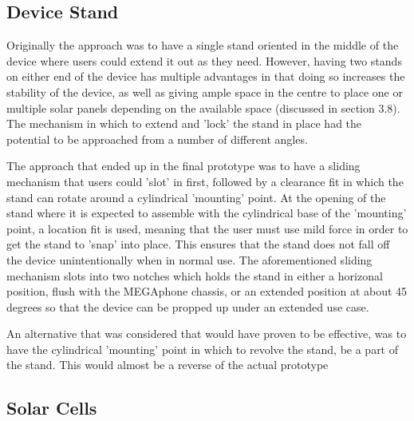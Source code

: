 \subsection{Device Stand}

Originally the approach was to have a single stand oriented in the middle of the device where users could extend it out as they need.
However, having two stands on either end of the device has multiple advantages in that doing so increases the stability of the device, as well as giving ample space in the centre to place one or multiple solar panels depending on the available space (discussed in section 3.8).
The mechanism in which to extend and 'lock' the stand in place had the potential to be approached from a number of different angles.

The approach that ended up in the final prototype was to have a sliding mechanism that users could 'slot' in first, followed by a clearance fit in which the stand can rotate around a cylindrical 'mounting' point.  %
At the opening of the stand where it is expected to assemble with the cylindrical base of the 'mounting' point, a location fit is used, meaning that the user must use mild force in order to get the stand to 'snap' into place.
This ensures that the stand does not fall off the device unintentionally when in normal use.
The aforementioned sliding mechanism slots into two notches which holds the stand in either a horizonal position, flush with the MEGAphone chassis, or an extended position at about 45 degrees so that the device can be propped up under an extended use case.

An alternative that was considered that would have proven to be effective, was to have the cylindrical 'mounting' point in which to revolve the stand, be a part of the stand.
This would almost be a reverse of the actual prototype


\subsection{Solar Cells}

